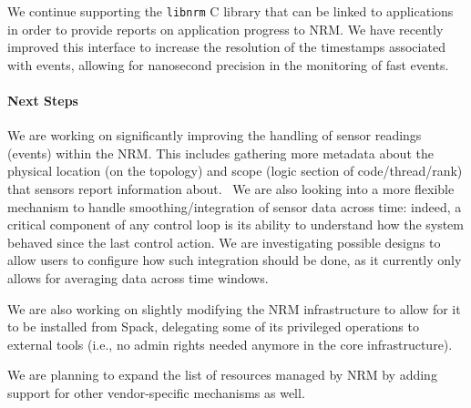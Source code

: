 We continue supporting the \texttt{libnrm} C library that can be linked to
applications in order to provide reports on application progress to NRM. We
have recently improved this interface to increase the resolution of the
timestamps associated with events, allowing for nanosecond precision in the
monitoring of fast events.

\paragraph{Next Steps}

We are working on significantly improving the handling of sensor readings
(events) within the NRM. This includes gathering more metadata about the
physical location (on the topology) and scope (logic section of
code/thread/rank) that sensors report information about.  We are also
looking into a more flexible mechanism to handle smoothing/integration of
sensor data across time: indeed, a critical component of any control loop
is its ability to understand how the system behaved since the last control
action. We are investigating possible designs to allow users to configure
how such integration should be done, as it currently only allows for
averaging data across time windows.

We are also working on slightly modifying the NRM infrastructure to allow
for it to be installed from Spack, delegating some of its privileged
operations to external tools (i.e., no admin rights needed anymore in the
core infrastructure).

We are planning to expand the list of resources managed by NRM by adding
support for other vendor-specific mechanisms as well.
